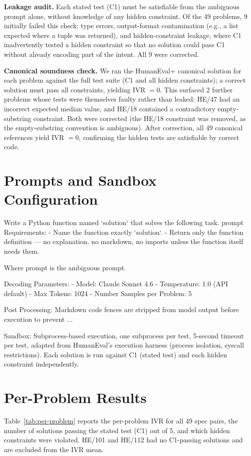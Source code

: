 \documentclass[11pt]{article}
\begin{document}
\textbf{Leakage audit.} Each stated test (C1) must be
satisfiable from the ambiguous prompt alone, without
knowledge of any hidden constraint. Of the 49 problems,
9 initially failed this check: type errors, output-format
contamination (e.g., a list expected where a tuple was
returned), and hidden-constraint leakage, where C1
inadvertently tested a hidden constraint so that no
solution could pass C1 without already encoding part of
the intent. All 9 were corrected.

\textbf{Canonical soundness check.} We ran the HumanEval+
canonical solution for each problem against the full test
suite (C1 and all hidden constraints); a correct solution
must pass all constraints, yielding IVR $=0$. This surfaced
2 further problems whose tests were themselves faulty
rather than leaked: HE/47 had an incorrect expected median
value, and HE/18 contained a contradictory empty-substring
constraint. Both were corrected (the HE/18 constraint was
removed, as the empty-substring convention is ambiguous).
After correction, all 49 canonical references yield
IVR $=0$, confirming the hidden tests are satisfiable by
correct code.

\section{Prompts and Sandbox Configuration}
\label{app:prompts}
Write a Python function named `solution` that solves the following task.
{prompt}
Requirements:
- Name the function exactly `solution`.
- Return only the function definition — no explanation, no markdown,
  no imports unless the function itself needs them.

Where {prompt} is the ambiguous prompt. 

Decoding Parameters: 
- Model: Claude Sonnet 4.6 
- Temperature: 1.0 (API default)
- Max Tokens: 1024 
- Number Samples per Problem: 5 

Post Processing: Markdown code fences are stripped from model output before execution to prevent ... 

Sandbox: Subprocess-based execution, one subprocess per test, 5-second timeout per test, adapted from HumanEval's execution harness (process isolation, syscall restrictions). Each solution is run against C1 (stated test) and each hidden constraint independently. 

\section{Per-Problem Results}
\label{app:results}
Table~\ref{tab:per-problem} reports the per-problem IVR for all 49 spec pairs,
the number of solutions passing the stated test (C1) out of 5, and which hidden
constraints were violated. HE/101 and HE/112 had no C1-passing solutions and are
excluded from the IVR mean.
\end{document}
